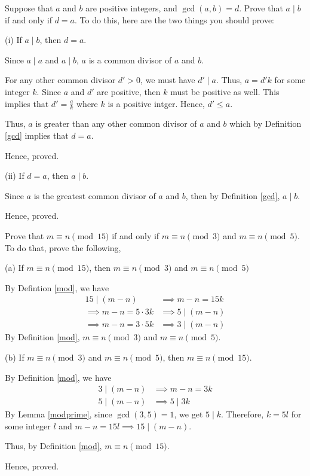 \begin{problem} Suppose that $a$ and $b$ are positive integers, and $\gcd(a, b) = d$. Prove that $a \mid b$ if and only if $d = a$. To do this, here are the two things you should prove:
	
	(i) If $a \mid b$, then $d = a$.
	\begin{solution}
		Since $a \mid a$ and $a \mid b$, $a$ is a common divisor of $a$ and $b$.

		For any other common divisor $d' > 0$, we must have $d' \mid a$. Thus, $a = d'k$ for some integer $k$. Since $a$ and $d'$ are positive, then $k$ must be positive as well. This implies that $d' = \frac{a}{k}$ where $k$ is a positive intger. Hence, $d' \leq a$.

		Thus, $a$ is greater than any other common divisor of $a$ and $b$ which by Definition \ref{gcd} implies that $d = a$.

		Hence, proved.
	\end{solution}

	(ii) If $d = a$, then $a \mid b$.
	\begin{solution}
		Since $a$ is the greatest common divisor of $a$ and $b$, then by Definition \ref{gcd}, $a \mid b$.

		Hence, proved.
	\end{solution}

\end{problem}

\begin{problem}
	Prove that $m \equiv n \pmod{15}$ if and only if $m \equiv n \pmod{3}$ and $m \equiv n \pmod{5}$. To do that, prove the following,

	\bigbreak
	(a) If $m \equiv n \pmod{15}$, then $m \equiv n \pmod{3}$ and $m \equiv n \pmod{5}$
	\begin{solution}
		By Defintion \ref{mod}, we have 
		\begin{align}
			15 \mid (m-n) &\implies m-n = 15k \\
			\implies m-n = 5 \cdot 3k &\implies 5 \mid (m-n) \\
			\implies m-n = 3 \cdot 5k &\implies 3 \mid (m-n)
		\end{align}
		By Definition \ref{mod}, $m \equiv n \pmod{3}$ and $m \equiv n \pmod{5}$.
	\end{solution}

	(b) If $m \equiv n \pmod{3}$ and $m \equiv n \pmod{5}$, then $m \equiv n \pmod{15}$.
	\begin{solution}
		By Definition \ref{mod},  we have
		\begin{align}
			3 \mid (m-n) &\implies m - n = 3k \\
			5 \mid (m-n) &\implies 5 \mid 3k
		\end{align}
		By Lemma \ref{modprime}, since $\gcd(3,5)=1$, we get $5 \mid k$. Therefore, $k = 5l$ for some integer $l$ and $m-n = 15l \implies 15 \mid (m-n)$.

		Thus, by Definition \ref{mod}, $m \equiv n \pmod{15}$.

		Hence, proved.
	\end{solution}
\end{problem}


